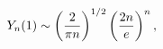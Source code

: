 \[\mathop{Y_{n}\/}\nolimits\!\left(1\right)\sim\left(\frac{2}{\pi n}\right)^{1/2%
}\left(\frac{2n}{e}\right)^{n},\]
